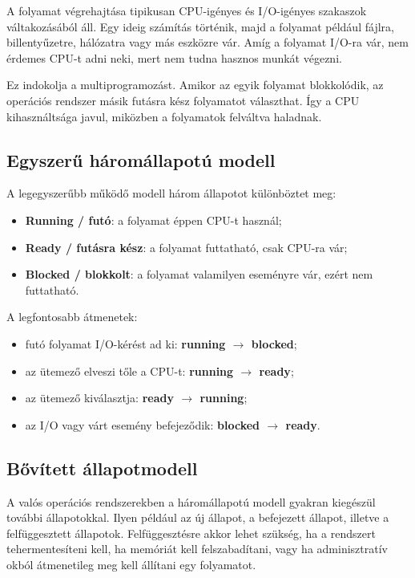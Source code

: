 A folyamat végrehajtása tipikusan CPU-igényes és I/O-igényes szakaszok váltakozásából áll. Egy ideig számítás történik, majd a folyamat például fájlra, billentyűzetre, hálózatra vagy más eszközre vár. Amíg a folyamat I/O-ra vár, nem érdemes CPU-t adni neki, mert nem tudna hasznos munkát végezni.

Ez indokolja a multiprogramozást. Amikor az egyik folyamat blokkolódik, az operációs rendszer másik futásra kész folyamatot választhat. Így a CPU kihasználtsága javul, miközben a folyamatok felváltva haladnak.

\subsection{Egyszerű háromállapotú modell}

A legegyszerűbb működő modell három állapotot különböztet meg:

\begin{itemize}
  \item \textbf{Running / futó}: a folyamat éppen CPU-t használ;
  \item \textbf{Ready / futásra kész}: a folyamat futtatható, csak CPU-ra vár;
  \item \textbf{Blocked / blokkolt}: a folyamat valamilyen eseményre vár, ezért nem futtatható.
\end{itemize}

A legfontosabb átmenetek:

\begin{itemize}
  \item futó folyamat I/O-kérést ad ki: \textbf{running $\rightarrow$ blocked};
  \item az ütemező elveszi tőle a CPU-t: \textbf{running $\rightarrow$ ready};
  \item az ütemező kiválasztja: \textbf{ready $\rightarrow$ running};
  \item az I/O vagy várt esemény befejeződik: \textbf{blocked $\rightarrow$ ready}.
\end{itemize}

\subsection{Bővített állapotmodell}

A valós operációs rendszerekben a háromállapotú modell gyakran kiegészül további állapotokkal. Ilyen például az új állapot, a befejezett állapot, illetve a felfüggesztett állapotok. Felfüggesztésre akkor lehet szükség, ha a rendszert tehermentesíteni kell, ha memóriát kell felszabadítani, vagy ha adminisztratív okból átmenetileg meg kell állítani egy folyamatot.

